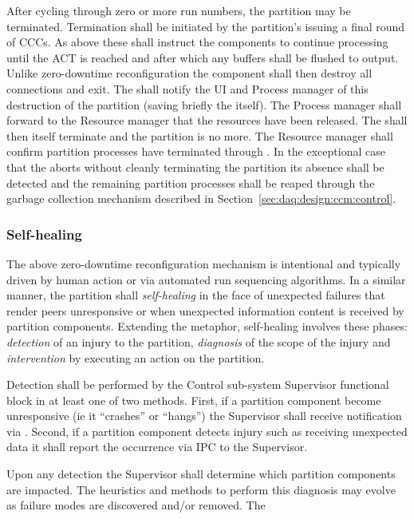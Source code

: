 After cycling through zero or more run numbers, the partition may be terminated. 
Termination shall be initiated by the partition's  issuing a final round of CCCs. 
As above these shall instruct the components to continue processing until the ACT is reached and after which any buffers shall be flushed to output. 
Unlike zero-downtime reconfiguration the component shall then destroy all connections and exit. 
The  shall notify the UI and Process manager of this destruction of the partition (saving briefly the  itself). 
The Process manager shall forward to the Resource manager that the resources have been released. 
The  shall then itself terminate and the partition is no more.
The Resource manager shall confirm partition processes have terminated through . 
In the exceptional case that the  aborts without cleanly terminating the partition its absence shall be detected and the remaining partition processes shall be reaped through the garbage collection mechanism described in Section~\ref{sec:daq:design:ccm:control}.

\subsubsection{Self-healing}
\label{sec:daq:self-healing}

The above zero-downtime reconfiguration mechanism is intentional and typically driven by human action or via automated run sequencing algorithms. 
In a similar manner, the partition shall \textit{self-healing} in the face of unexpected failures that render peers unresponsive or when unexpected information content is received by partition components.  
Extending the metaphor, self-healing involves these phases: \textit{detection} of an injury to the partition, \textit{diagnosis} of the scope of the injury and \textit{intervention} by executing an action on the partition.

Detection shall be performed by the  Control sub-system Supervisor functional block in at least one of two methods.
First, if a partition component become unresponsive (ie it ``crashes'' or ``hangs'') the Supervisor shall receive notification via  . 
Second, if a partition component detects injury such as receiving unexpected data it shall report the occurrence via IPC to the Supervisor.

Upon any detection the Supervisor shall determine which partition components are impacted.  The heuristics and methods to perform this diagnosis may evolve as failure modes are discovered and/or removed.  The 

